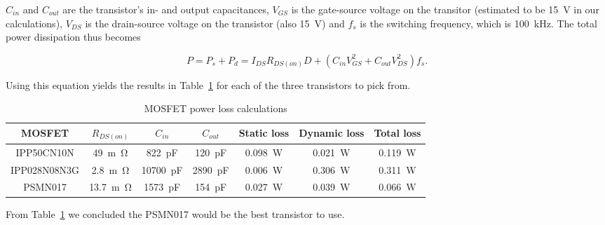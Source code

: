 \documentclass[11pt,titlepage]{report}
\begin{document}
$C_{in}$ and $C_{out}$ are the transistor's in- and output capacitances, $V_{GS}$ is the gate-source voltage on the transitor (estimated to be \SI{15}{V} in our calculations), $V_{DS}$ is the drain-source voltage on the transistor (also \SI{15}{V}) and $f_{s}$ is the switching frequency, which is \SI{100}{kHz}.
The total power dissipation thus becomes

\begin{equation}
P = P_{s} + P_{d} = I_{DS}R_{DS(on)}D + (C_{in}V_{GS}^2 + C_{out}V_{DS}^2)f_{s} .
\end{equation}

Using this equation yields the results in Table~\ref{tab:ass1-power-loss} for each of the three transistors to pick from.

\begin{table}[H]
	\centering
	\caption{MOSFET power loss calculations}
	\label{tab:ass1-power-loss}
	\begin{tabular}{c c c c c c c}
		\hline\hline
		MOSFET & $R_{DS(on)}$ & $C_{in}$ & $C_{out}$ & Static loss & Dynamic loss & Total loss \\
		\hline
		IPP50CN10N & \SI{49}{m\ohm} & \SI{822}{pF} & \SI{120}{pF} & \SI{0.098}{W} & \SI{0.021}{W} & \SI{0.119}{W} \\
		IPP028N08N3G & \SI{2.8}{m\ohm} & \SI{10700}{pF} & \SI{2890}{pF} & \SI{0.006}{W} & \SI{0.306}{W} & \SI{0.311}{W} \\
		PSMN017 & \SI{13.7}{m\ohm} & \SI{1573}{pF} & \SI{154}{pF} & \SI{0.027}{W} & \SI{0.039}{W} & \SI{0.066}{W} \\
		\hline
		\end{tabular}
\end{table}

From Table~\ref{tab:ass1-power-loss} we concluded the PSMN017 would be the best transistor to use.
 
\end{document}
